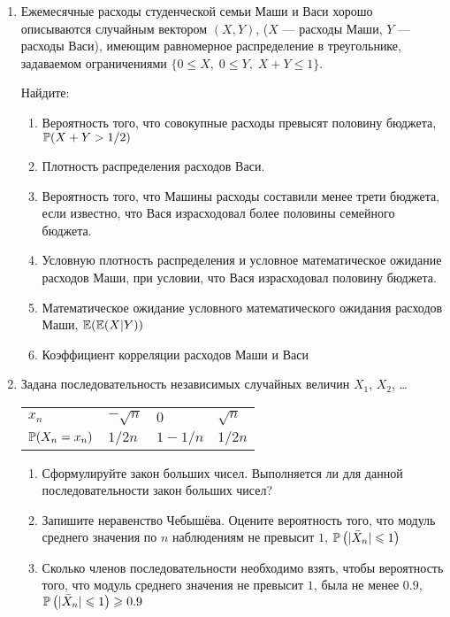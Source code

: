 \begin{enumerate}
\item Ежемесячные расходы студенческой семьи Маши и Васи хорошо описываются случайным
вектором $(X,Y)$, ($X$ — расходы Маши, $Y$ — расходы Васи), имеющим равномерное
распределение в треугольнике, задаваемом ограничениями $\{0 \leq X, \; 0\leq Y,
\; X+Y \leq 1 \}$.

Найдите:

\begin{enumerate}
\item Вероятность того, что совокупные расходы превысят половину бюджета, $\P(X+Y>1/2)$
\item Плотность распределения расходов Васи.
\item Вероятность того, что Машины расходы составили менее трети бюджета, если
известно, что Вася израсходовал более половины семейного бюджета.
\item Условную плотность распределения и условное математическое ожидание расходов Маши,
при условии, что Вася израсходовал половину бюджета.
\item Математическое ожидание условного математического ожидания расходов Маши,
$\E(\E(X|Y))$
\item Коэффициент корреляции расходов Маши и Васи
\end{enumerate}

\item Задана последовательность независимых случайных величин $X_1$, $X_2$, \ldots

\begin{center}
\begin{tabular}{llll}
\toprule
$x_n$ & $-\sqrt{n}$ & $0$ & $\sqrt{n}$ \\
$\P(X_n = x_n)$ & $1/2n$ & $1-1/n$ & $1/2n$ \\
\bottomrule
\end{tabular}
\end{center}

\begin{enumerate}
\item Сформулируйте закон больших чисел. Выполняется ли для данной последовательности
закон больших чисел?
\item Запишите неравенство Чебышёва. Оцените вероятность того, что модуль среднего
значения по $n$ наблюдениям не превысит $1$, $\P\left(|\bar X_n| \leq 1\right)$
\item Сколько членов последовательности необходимо взять, чтобы вероятность того, что
модуль среднего значения не превысит $1$, была не менее $0.9$, $\P\left(|\bar X_n| \leq 1\right)\geq 0.9$
\end{enumerate}


\end{enumerate}
